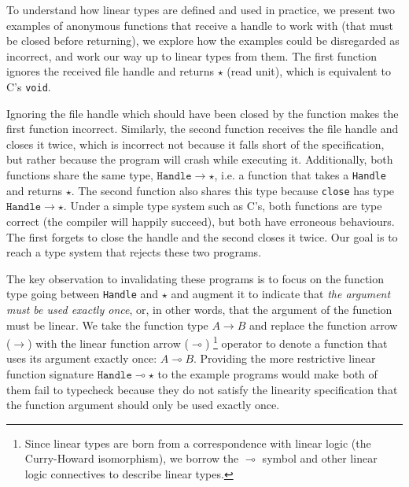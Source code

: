 \documentclass[]{lwnovathesis}
\newcommand{\lolli}{\multimap}
\begin{document}
To understand how linear types are defined and used in practice, we present two
examples of anonymous functions that receive a handle to work with (that must be
closed before returning), we explore how the examples could be disregarded as
incorrect, and work our way up to linear types from them. The first function
ignores the received file handle and returns $\star$ (read unit), which is
equivalent to C's \texttt{void}.
%

Ignoring the file handle which should have been closed by the function makes the
first function incorrect. Similarly, the second function receives the file
handle and closes it twice, which is incorrect not because it falls short of the
specification, but rather because the program will crash while executing it.
%
Additionally, both functions share the same type, $\texttt{Handle} \to \star$,
i.e.  a function that takes a \texttt{Handle} and returns $\star$. The second
function also shares this type because \texttt{close} has type $\texttt{Handle}
\to \star$.
%
Under a simple type system such as C's, both functions are type correct (the
compiler will happily succeed), but both have erroneous behaviours. The first
forgets to close the handle and the second closes it twice. Our goal is to reach
a type system that rejects these two programs.

The key observation to invalidating these programs is to focus on the function
type going between \texttt{Handle} and $\star$ and augment it to indicate that
\emph{the argument must be used exactly once}, or, in other words, that the
argument of the function must be linear. We take the function type $A \to B$
and replace the function arrow ($\to$) with the linear function arrow ($\lolli$)
%
\footnote{Since linear types are born from a correspondence with linear
logic\cite{linear-logic} (the Curry-Howard isomorphism\cite{curry-howard}), we
borrow the $\lolli$ symbol and other linear logic connectives to describe linear
types.}
%
operator to denote a function that uses its argument exactly once: $A \lolli B$.
%
Providing the more restrictive linear function signature $\texttt{Handle} \lolli
\star$ to the example programs would make both of them fail to typecheck because
they do not satisfy the linearity specification that the function argument
should only be used exactly once.
\end{document}
